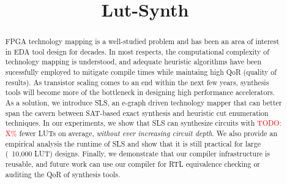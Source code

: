 \documentclass[sigplan,nonacm]{acmart}
\newcommand{\todo}[1]{\textcolor{red}{TODO: #1}}
\newcommand{\fullname}{Lut-Synth}
\newcommand{\shortname}{SLS}
\begin{document}
\title{\fullname}

\begin{abstract}
    FPGA technology mapping is a well-studied problem and has been an area of interest in EDA tool design for decades.
    In most respects, the computational complexity of technology mapping is understood, and adequate heuristic algorithms have been sucessfully employed to mitigate compile times while maintaing high QoR (quality of results).
    As transistor scaling comes to an end within the next few years, synthesis tools will become more of the bottleneck in designing high performance accelerators. As a solution, we introduce \shortname{}, an e-graph driven technology mapper that can better span the cavern between SAT-based exact synthesis and heuristic cut enumeration techniques.
    In our experiments, we show that \shortname{} can synthesize circuits with \todo{X\%} fewer LUTs on average, \textit{without ever increasing circuit depth}.
    We also provide an empirical analysis the runtime of \shortname{} and show that it is still practical for large (~10,000 LUT) designs.
    Finally, we demonstrate that our compiler infrastructure is reusable, and future work can use our compiler for RTL equivalence checking or auditing the QoR of synthesis tools.
\end{abstract}
\maketitle %








\end{document}
